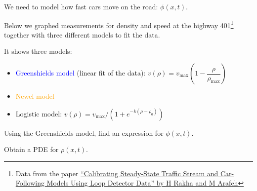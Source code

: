 \documentclass{workbook}
\begin{document}
\begin{slide}


We need to model how fast cars move on the road: $\phi(x,t)$.

Below we graphed measurements for density and speed at the highway 401\footnote{Data from the paper \href{https://doi.org/10.1287/trsc.1090.0297}{``Calibrating Steady-State Traffic Stream and Car-Following Models Using Loop Detector Data'' by H Rakha and M Arafeh}} together with three different models to fit the data.
\begin{center}
\end{center}

It shows three models:
\begin{itemize}
	\item[\textcolor{blue}{\textbullet}] \textcolor{blue}{Greenshields model} (linear fit of the data): $v(\rho) = v_{\max} \left(1 - \dfrac{\rho}{\rho_{\max}}\right)$
	\item[\textcolor{orange}{\textbullet}] \textcolor{orange}{Newel model}
	\item[\textcolor{black!60!green}{\textbullet}] \textcolor{black!60!green}{Logistic model}: $v(\rho) = v_{\max} / \left(1+ e^{-k(\rho - \rho_0)}\right)$
\end{itemize}

\begin{parts}
\setcounter{partsitem}{3}
	\item Using the Greenshields model, find an expression for $\phi(x,t)$.	
	\item Obtain a PDE for $\rho(x,t)$.
\end{parts}

	
\end{slide}
\end{document}
